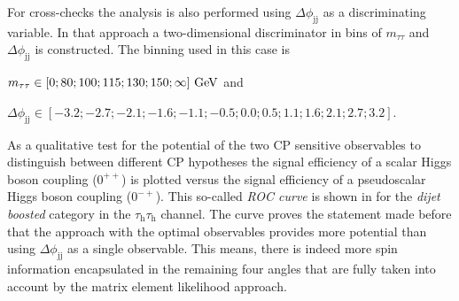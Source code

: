 For cross-checks the analysis is also performed using $\Delta\phi_\text{jj}$ as a discriminating variable. In that approach a two-dimensional discriminator in bins of $m_{\tau\tau}$ and $\Delta\phi_\text{jj}$ is constructed. The binning 
used in this case is 
\begin{ct_version_list}
    \item  $m_{\tau\tau} \in \left[ 0; 80;100;115;130;150;\infty \right]\text{\,{GeV}}$ and
    \item  $\Delta\phi_\text{jj} \in \left[-3.2;-2.7;-2.1;-1.6;-1.1;-0.5;0.0;0.5;1.1;1.6;2.1;2.7;3.2 \right]$.
\end{ct_version_list}
As a qualitative test for the potential of the two CP sensitive observables to distinguish between different CP hypotheses the signal efficiency of a scalar Higgs boson coupling ($0^{++}$) is plotted versus the signal efficiency of a pseudoscalar Higgs boson coupling ($0^{-+}$).
This so-called \textit{ROC curve} is shown in  for the \textit{dijet boosted} category in the $\tau_\text{h}\tau_\text{h}$ channel. The curve proves the statement made before that the approach with the optimal observables
provides more potential than using $\Delta\phi_\text{jj}$ as a single observable. This means, there is indeed more spin information encapsulated in the remaining four angles that are fully taken into account by the matrix element likelihood approach.

